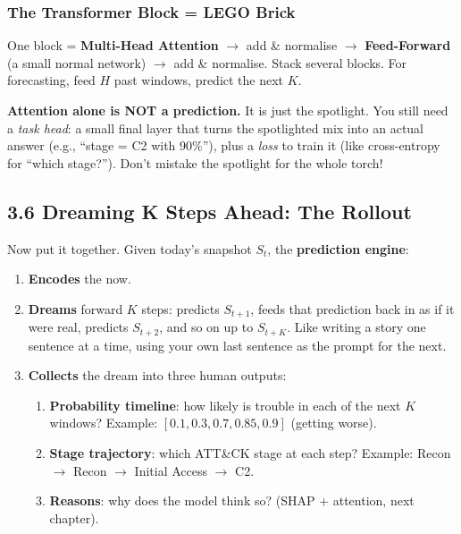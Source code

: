 \documentclass[11pt,a4paper]{article}
\begin{document}
\subsubsection{The Transformer Block = LEGO Brick}

One block = \textbf{Multi-Head Attention} $\to$ add \& normalise $\to$
\textbf{Feed-Forward} (a small normal network) $\to$ add \& normalise. Stack
several blocks. For forecasting, feed $H$ past windows, predict the next $K$.

\begin{warnbox}
\textbf{Attention alone is NOT a prediction.} It is just the spotlight. You
still need a \emph{task head}: a small final layer that turns the spotlighted
mix into an actual answer (e.g., ``stage = C2 with 90\%''), plus a
\emph{loss} to train it (like cross-entropy for ``which stage?''). Don't
mistake the spotlight for the whole torch!
\end{warnbox}

\subsection{3.6 Dreaming K Steps Ahead: The Rollout}
\label{sec:rollout}

Now put it together. Given today's snapshot $S_t$, the \textbf{prediction
engine}:

\begin{enumerate}[leftmargin=1.8em,itemsep=2pt]
  \item \textbf{Encodes} the now.
  \item \textbf{Dreams} forward $K$ steps: predicts $S_{t+1}$, feeds that
        prediction back in as if it were real, predicts $S_{t+2}$, and so on up
to $S_{t+K}$. Like writing a story one sentence at a time, using your
own last sentence as the prompt for the next.
  \item \textbf{Collects} the dream into three human outputs:
        \begin{enumerate}[label=\alph*.,leftmargin=1.6em]
          \item \textbf{Probability timeline}: how likely is trouble in each of
the next $K$ windows? Example: $[0.1, 0.3, 0.7, 0.85, 0.9]$
(getting worse).
          \item \textbf{Stage trajectory}: which ATT\&CK stage at each step?
Example: Recon $\to$ Recon $\to$ Initial Access $\to$ C2.
          \item \textbf{Reasons}: why does the model think so? (SHAP + attention,
next chapter).
        \end{enumerate}
\end{enumerate}
\end{document}
